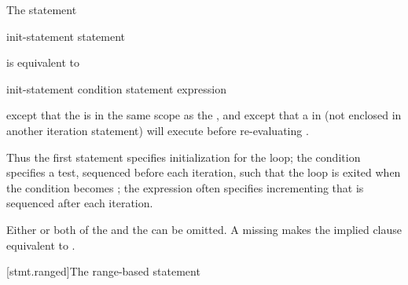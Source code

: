 \pnum
The  statement
\begin{ncsimplebnf}
 \terminal{(} init-statement  \terminal{;}  \terminal{)} statement
\end{ncsimplebnf}
is equivalent to
\begin{ncsimplebnf}
\terminal{\{}\br
\bnfindent init-statement\br
\bnfindent {} \terminal{(} condition \terminal{)} \terminal{\{}\br
\bnfindent\bnfindent \terminal{\{} statement \terminal{\}} \br
\bnfindent\bnfindent expression \terminal{;}\br
\bnfindent \terminal{\}}\br
\terminal{\}}
\end{ncsimplebnf}
except that the  is
in the same scope as the , and
except that a
%
 in  (not enclosed in another
iteration statement) will execute  before
re-evaluating .
\begin{note}
Thus the first statement specifies initialization for the loop; the
condition specifies a test, sequenced before each
iteration, such that the loop is exited when the condition becomes
; the expression often specifies incrementing that is
sequenced after each iteration.
\end{note}

\pnum
Either or both of the 
and the  can be omitted.
A missing 
makes the implied  clause
equivalent to .

[stmt.ranged]{The range-based  statement}%


